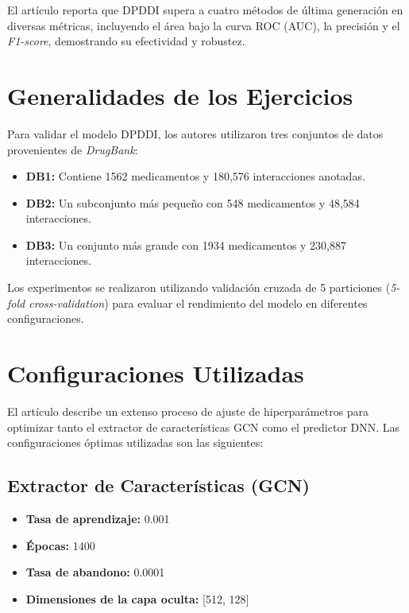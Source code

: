 El artículo reporta que DPDDI supera a cuatro métodos de última generación en diversas métricas, incluyendo el área bajo la curva ROC (AUC), la precisión y el \textit{F1-score}, demostrando su efectividad y robustez.

\section{Generalidades de los Ejercicios}

Para validar el modelo DPDDI, los autores utilizaron tres conjuntos de datos provenientes de \textit{DrugBank}:

\begin{itemize}
    \item \textbf{DB1:} Contiene 1562 medicamentos y 180,576 interacciones anotadas.
    \item \textbf{DB2:} Un subconjunto más pequeño con 548 medicamentos y 48,584 interacciones.
    \item \textbf{DB3:} Un conjunto más grande con 1934 medicamentos y 230,887 interacciones.
\end{itemize}

Los experimentos se realizaron utilizando validación cruzada de 5 particiones (\textit{5-fold cross-validation}) para evaluar el rendimiento del modelo en diferentes configuraciones.

\section{Configuraciones Utilizadas}

El artículo describe un extenso proceso de ajuste de hiperparámetros para optimizar tanto el extractor de características GCN como el predictor DNN. Las configuraciones óptimas utilizadas son las siguientes:

\subsection{Extractor de Características (GCN)}
\begin{itemize}
    \item \textbf{Tasa de aprendizaje:} 0.001
    \item \textbf{Épocas:} 1400
    \item \textbf{Tasa de abandono:} 0.0001
    \item \textbf{Dimensiones de la capa oculta:} [512, 128]
\end{itemize}

